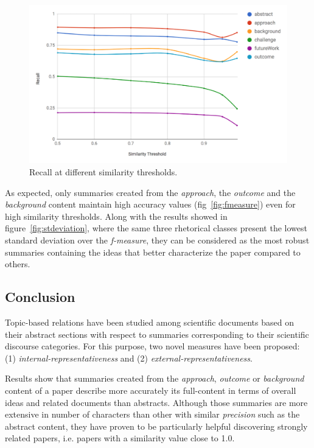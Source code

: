 \begin{figure}[!htbp]
  \center
  \includegraphics[scale=0.4]{recall.png}
  \caption{Recall at different similarity thresholds.}
  \label{fig:recall}
\end{figure}


As expected, only summaries created from the \textit{approach}, the \textit{outcome} and the \textit{background} content maintain high accuracy values (fig~\ref{fig:fmeasure}) even for high similarity thresholds. Along with the results showed in figure~\ref{fig:stdeviation}, where the same three rhetorical classes present the lowest standard deviation over the \textit{f-measure}, they can be considered as the most robust summaries containing the ideas that better characterize the paper compared to others.


\subsection{Conclusion}
Topic-based relations have been studied among scientific documents based on their abstract sections with respect to summaries corresponding to their scientific discourse categories. For this purpose, two novel measures have been proposed: (1) \textit{internal-representativeness} and (2) \textit{external-representativeness}.

Results show that summaries created from the \textit{approach}, \textit{outcome} or \textit{background} content of a paper describe more accurately its full-content in terms of overall ideas and related documents than abstracts. Although those summaries are more extensive in number of characters than other with similar \textit{precision} such as the abstract content, they have proven to be particularly helpful  discovering strongly related papers, i.e. papers with a similarity value close to 1.0.

